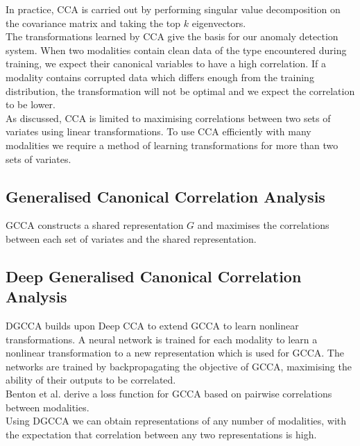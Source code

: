In practice, CCA is carried out by performing singular value decomposition on the covariance matrix and taking the top $k$ eigenvectors. \\

The transformations learned by CCA give the basis for our anomaly detection system. When two modalities contain clean data of the type encountered during training, we expect their canonical variables to have a high correlation. If a modality contains corrupted data which differs enough from the training distribution, the transformation will not be optimal and we expect the correlation to be lower.\\

As discussed, CCA is limited to maximising correlations between two sets of variates using linear transformations. To use CCA efficiently with many modalities we require a method of learning transformations for more than two sets of variates.

\subsection{Generalised Canonical Correlation Analysis}
GCCA \cite{GCCA} constructs a shared representation $G$ and maximises the correlations between each set of variates and  the shared representation.

\subsection{Deep Generalised Canonical Correlation Analysis}
DGCCA builds upon Deep CCA \cite{DCCA} to extend GCCA to learn nonlinear transformations. A neural network is trained for each modality to learn a nonlinear transformation to a new representation which is used for GCCA. The networks are trained by backpropagating the objective of GCCA, maximising the ability of their outputs to be correlated.\\

Benton et al. \cite{DGCCA} derive a loss function for GCCA based on pairwise correlations between modalities.\\

Using DGCCA we can obtain representations of any number of modalities, with the expectation that correlation between any two representations is high.

